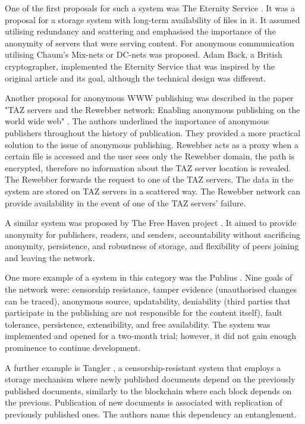 One of the first proposals for such a system was The Eternity Service \cite{eternity}. It was a proposal for a storage system with long-term availability of files in it. It assumed utilising redundancy and scattering and emphasised the importance of the anonymity of servers that were serving content. For anonymous communication utilising Chaum's Mix-nets or DC-nets was proposed. Adam Back, a British cryptographer, implemented the Eternity Service \cite{back1997eternity} that was inspired by the original article and its goal, although the technical design was different.

Another proposal for anonymous WWW publishing was described in the paper "TAZ servers and the Rewebber network: Enabling anonymous publishing on the world wide web" \cite{rewebber}. The authors underlined the importance of anonymous publishers throughout the history of publication. They provided a more practical solution to the issue of anonymous publishing.  Rewebber acts as a proxy when a certain file is accessed and the user sees only the Rewebber domain, the path is encrypted, therefore no information about the TAZ server location is revealed. The Rewebber forwards the request to one of the TAZ servers. The data in the system are stored on TAZ servers in a scattered way. The Rewebber network can provide availability in the event of one of the TAZ servers' failure.

A similar system was proposed by The Free Haven project \cite{freehaven}. It aimed to provide anonymity for publishers, readers, and senders, accountability without sacrificing anonymity, persistence, and robustness of storage, and flexibility of peers joining and leaving the network.

One more example of a system in this category was the Publius \cite{publius}. Nine goals of the network were: censorship resistance, tamper evidence (unauthorised changes can be traced), anonymous source, updatability, deniability (third parties that participate in the publishing are not responsible for the content itself), fault tolerance, persistence, extensibility, and free availability. The system was implemented and opened for a two-month trial; however, it did not gain enough prominence to continue development.

A further example is Tangler \cite{tangler},  a censorship-resistant system that employs a storage mechanism where newly published documents depend on the previously published documents, similarly to the blockchain where each block depends on the previous. Publication of new documents is associated with replication of previously published ones. The authors name this dependency an entanglement.

